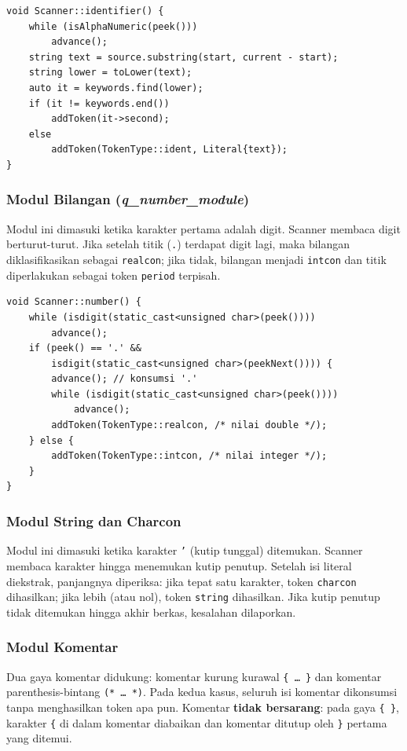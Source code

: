 \documentclass[12pt,a4paper]{article}
\begin{document}
\begin{lstlisting}[style=cpp, caption={Penanganan identifier dan kata kunci}]
void Scanner::identifier() {
    while (isAlphaNumeric(peek()))
        advance();
    string text = source.substring(start, current - start);
    string lower = toLower(text);
    auto it = keywords.find(lower);
    if (it != keywords.end())
        addToken(it->second);
    else
        addToken(TokenType::ident, Literal{text});
}
\end{lstlisting}

\subsubsection{Modul Bilangan (\textit{q\_number\_module})}
Modul ini dimasuki ketika karakter pertama adalah digit. Scanner membaca digit berturut-turut. Jika setelah titik (\texttt{.}) terdapat digit lagi, maka bilangan diklasifikasikan sebagai \texttt{realcon}; jika tidak, bilangan menjadi \texttt{intcon} dan titik diperlakukan sebagai token \texttt{period} terpisah.

\begin{lstlisting}[style=cpp, caption={Penanganan bilangan bulat dan riil}]
void Scanner::number() {
    while (isdigit(static_cast<unsigned char>(peek())))
        advance();
    if (peek() == '.' &&
        isdigit(static_cast<unsigned char>(peekNext()))) {
        advance(); // konsumsi '.'
        while (isdigit(static_cast<unsigned char>(peek())))
            advance();
        addToken(TokenType::realcon, /* nilai double */);
    } else {
        addToken(TokenType::intcon, /* nilai integer */);
    }
}
\end{lstlisting}

\subsubsection{Modul String dan Charcon}
Modul ini dimasuki ketika karakter \texttt{'} (kutip tunggal) ditemukan. Scanner membaca karakter hingga menemukan kutip penutup. Setelah isi literal diekstrak, panjangnya diperiksa: jika tepat satu karakter, token \texttt{charcon} dihasilkan; jika lebih (atau nol), token \texttt{string} dihasilkan. Jika kutip penutup tidak ditemukan hingga akhir berkas, kesalahan dilaporkan.

\subsubsection{Modul Komentar}
Dua gaya komentar didukung: komentar kurung kurawal \texttt{\{ \ldots\ \}} dan komentar parenthesis-bintang \texttt{(* \ldots\ *)}. Pada kedua kasus, seluruh isi komentar dikonsumsi tanpa menghasilkan token apa pun. Komentar \textbf{tidak bersarang}: pada gaya \texttt{\{ \}}, karakter \texttt{\{} di dalam komentar diabaikan dan komentar ditutup oleh \texttt{\}} pertama yang ditemui.
\end{document}
